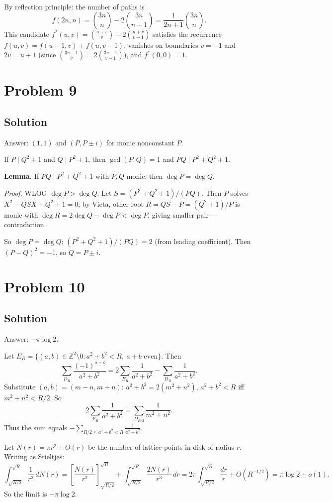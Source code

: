 \documentclass{article}
\begin{document}
By reflection principle: the number of paths is
\[ f(2n, n) = \binom{3n}{n} - 2 \binom{3n}{n-1} = \frac{1}{2n+1} \binom{3n}{n}. \]
This candidate $f^*(u,v) = \binom{u+v}{v} - 2\binom{u+v}{v-1}$ satisfies the recurrence $f(u,v) = f(u-1,v) + f(u,v-1)$, vanishes on boundaries $v = -1$ and $2v = u+1$ (since $\binom{3v-1}{v} = 2\binom{3v-1}{v-1}$), and $f^*(0,0) = 1$.

\section*{Problem 9}
\subsection*{Solution}
Answer: $(1, 1)$ and $(P, P \pm i)$ for monic nonconstant $P$.

If $P \mid Q^2 + 1$ and $Q \mid P^2 + 1$, then $\gcd(P, Q) = 1$ and $PQ \mid P^2 + Q^2 + 1$.

\textbf{Lemma.} If $PQ \mid P^2 + Q^2 + 1$ with $P, Q$ monic, then $\deg P = \deg Q$.

\emph{Proof.} WLOG $\deg P > \deg Q$. Let $S = (P^2 + Q^2 + 1)/(PQ)$. Then $P$ solves $X^2 - QSX + Q^2 + 1 = 0$; by Vieta, other root $R = QS - P = (Q^2+1)/P$ is monic with $\deg R = 2\deg Q - \deg P < \deg P$, giving smaller pair — contradiction.

So $\deg P = \deg Q$; $(P^2 + Q^2 + 1)/(PQ) = 2$ (from leading coefficient). Then $(P - Q)^2 = -1$, so $Q = P \pm i$.

\section*{Problem 10}
\subsection*{Solution}
Answer: $-\pi \log 2$.

Let $E_R = \{(a,b) \in \mathbb{Z}^2 \setminus 0 : a^2 + b^2 < R,\ a+b \text{ even}\}$. Then
\[ \sum_{D_R} \frac{(-1)^{a+b}}{a^2 + b^2} = 2 \sum_{E_R} \frac{1}{a^2+b^2} - \sum_{D_R} \frac{1}{a^2+b^2}. \]
Substitute $(a,b) = (m-n, m+n)$: $a^2+b^2 = 2(m^2+n^2)$, $a^2+b^2 < R$ iff $m^2+n^2 < R/2$. So
\[ 2\sum_{E_R} \frac{1}{a^2+b^2} = \sum_{D_{R/2}} \frac{1}{m^2+n^2}. \]
Thus the sum equals $-\sum_{R/2 \leq a^2+b^2 < R} \frac{1}{a^2+b^2}$.

Let $N(r) = \pi r^2 + O(r)$ be the number of lattice points in disk of radius $r$. Writing as Stieltjes:
\[ \int_{\sqrt{R/2}}^{\sqrt{R}} \frac{1}{r^2}\, dN(r) = \left[\frac{N(r)}{r^2}\right]_{\sqrt{R/2}}^{\sqrt R} + \int_{\sqrt{R/2}}^{\sqrt R} \frac{2 N(r)}{r^3}\, dr = 2\pi \int_{\sqrt{R/2}}^{\sqrt R} \frac{dr}{r} + O(R^{-1/2}) = \pi \log 2 + o(1). \]
So the limit is $-\pi \log 2$.
\end{document}

